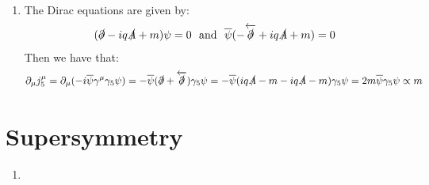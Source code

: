 \documentclass[10pt,a4paper]{article}
\begin{document}
\begin{enumerate}
\item The Dirac equations are given by:
\[
(\slashed{\partial} - i q \slashed{A} + m) \psi = 0 \mbox{~~and~~} \overline{\psi}(- \overleftarrow{\slashed{\partial}} + i q \slashed{A} + m) = 0 
\] 
Then we have that:
\[
\partial_\mu j_5^\mu = \partial_\mu (-i \overline{\psi} \gamma^\mu \gamma_5 \psi) = - \overline{\psi}( \slashed{\partial} + \overleftarrow{\slashed{\partial}} ) \gamma_5 \psi = - \overline{\psi}( i q \slashed{A} - m - i q \slashed{A} - m)\gamma_5 \psi = 2m \overline{\psi}\gamma_5 \psi \propto m 
\]
\end{enumerate}

\section{Supersymmetry}

\begin{enumerate}

\item 

\end{enumerate}
\end{document}
